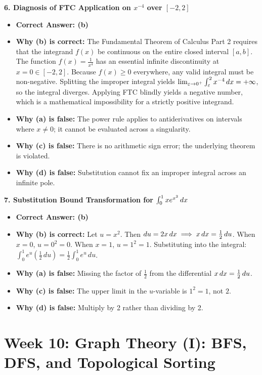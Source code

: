 \textbf{6. Diagnosis of FTC Application on $x^{-4}$ over $[-2, 2]$}
\begin{itemize}
    \item \textbf{Correct Answer: (b)}
    \item \textbf{Why (b) is correct:} The Fundamental Theorem of Calculus Part 2 requires that the integrand $f(x)$ be continuous on the entire closed interval $[a, b]$. The function $f(x) = \frac{1}{x^4}$ has an essential infinite discontinuity at $x = 0 \in [-2, 2]$. Because $f(x) \ge 0$ everywhere, any valid integral must be non-negative. Splitting the improper integral yields $\lim_{\varepsilon \to 0^+} \int_\varepsilon^2 x^{-4} \,dx = +\infty$, so the integral diverges. Applying FTC blindly yields a negative number, which is a mathematical impossibility for a strictly positive integrand.
    \item \textbf{Why (a) is false:} The power rule applies to antiderivatives on intervals where $x \neq 0$; it cannot be evaluated across a singularity.
    \item \textbf{Why (c) is false:} There is no arithmetic sign error; the underlying theorem is violated.
    \item \textbf{Why (d) is false:} Substitution cannot fix an improper integral across an infinite pole.
\end{itemize}

\textbf{7. Substitution Bound Transformation for $\int_0^1 x e^{x^2} \,dx$}
\begin{itemize}
    \item \textbf{Correct Answer: (b)}
    \item \textbf{Why (b) is correct:} Let $u = x^2$. Then $du = 2x \,dx \implies x \,dx = \frac{1}{2} \, du$. When $x = 0$, $u = 0^2 = 0$. When $x = 1$, $u = 1^2 = 1$. Substituting into the integral: $\int_0^1 e^u \left(\frac{1}{2} \, du\right) = \frac{1}{2} \int_0^1 e^u \, du$.
    \item \textbf{Why (a) is false:} Missing the factor of $\frac{1}{2}$ from the differential $x \,dx = \frac{1}{2} \, du$.
    \item \textbf{Why (c) is false:} The upper limit in the $u$-variable is $1^2 = 1$, not $2$.
    \item \textbf{Why (d) is false:} Multiply by 2 rather than dividing by 2.
\end{itemize}

\section*{Week 10: Graph Theory (I): BFS, DFS, and Topological Sorting}

